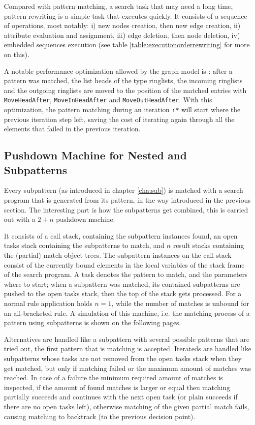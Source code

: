 Compared with pattern matching, a search task that may need a long time, pattern rewriting is a simple task that executes quickly. 
It consists of a sequence of operations, most notably: i) new nodes creation, then new edge creation, ii) attribute evaluation and assignment, iii) edge deletion, then node deletion, iv) embedded sequences execution (see table \ref{table:executionorderrewriting} for more on this).

A notable performance optimization allowed by the graph model is : after a pattern was matched, the list heads of the type ringlists, the incoming ringlists and the outgoing ringlists are moved to the position of the matched entries with \texttt{MoveHeadAfter}, \texttt{MoveInHeadAfter} and \texttt{MoveOutHeadAfter}.
With this optimization, the pattern matching during an iteration \texttt{r*} will start where the previous iteration step left, saving the cost of iterating again through all the elements that failed in the previous iteration.

\subsection*{Pushdown Machine for Nested and Subpatterns}\label{pushdownmachine}
Every subpattern (as introduced in chapter \ref{cha:sub}) is matched with a search program that is generated from its pattern, in the way introduced in the previous section. 
The interesting part is how the subpatterns get combined, this is carried out with a $2+n$ pushdown machine.

It consists of a call stack, containing the subpattern instances found, an open tasks stack containing the subpatterns to match, and $n$ result stacks containing the (partial) match object trees.
The subpattern instances on the call stack consist of the currently bound elements in the local variables of the stack frame of the search program.
A task denotes the pattern to match, and the parameters where to start; when a subpattern was matched, its contained subpatterns are pushed to the open tasks stack, then the top of the stack gets processed.
For a normal rule application holds $n=1$, while the number of matches is unbound for an all-bracketed rule.
A simulation of this machine, i.e. the matching process of a pattern using subpatterns is shown on the following pages.

Alternatives are handled like a subpattern with several possible patterns that are tried out, the first pattern that is matching is accepted.
Iterateds are handled like subpatterns whose tasks are not removed from the open tasks stack when they get matched, but only if matching failed or the maximum amount of matches was reached.
In case of a failure the minimum required amount of matches is inspected, if the amount of found matches is larger or equal then matching partially succeeds and continues with the next open task (or plain succeeds if there are no open tasks left), otherwise matching of the given partial match fails, causing matching to backtrack (to the previous decision point).

